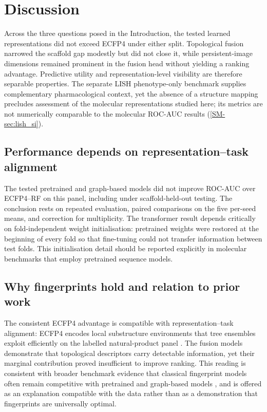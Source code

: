 \documentclass[11pt,a4paper]{article}
\begin{document}
\section{Discussion}

Across the three questions posed in the Introduction, the tested learned representations did not exceed ECFP4 under either split. Topological fusion narrowed the scaffold gap modestly but did not close it, while persistent-image dimensions remained prominent in the fusion head without yielding a ranking advantage. Predictive utility and representation-level visibility are therefore separable properties. The separate LISH phenotype-only benchmark supplies complementary pharmacological context, yet the absence of a structure mapping precludes assessment of the molecular representations studied here; its metrics are not numerically comparable to the molecular ROC-AUC results (\cref{SM-sec:lish_si}).

\subsection{Performance depends on representation--task alignment}

The tested pretrained and graph-based models did not improve ROC-AUC over ECFP4--RF on this panel, including under scaffold-held-out testing. The conclusion rests on repeated evaluation, paired comparisons on the five per-seed means, and correction for multiplicity. The transformer result depends critically on fold-independent weight initialisation: pretrained weights were restored at the beginning of every fold so that fine-tuning could not transfer information between test folds. This initialisation detail should be reported explicitly in molecular benchmarks that employ pretrained sequence models.

\subsection{Why fingerprints hold and relation to prior work}

The consistent ECFP4 advantage is compatible with representation--task alignment: ECFP4 encodes local substructure environments that tree ensembles exploit efficiently on the labelled natural-product panel \citep{ecfp_2010,learning_mol_repr_2020}. The fusion models demonstrate that topological descriptors carry detectable information, yet their marginal contribution proved insufficient to improve ranking. This reading is consistent with broader benchmark evidence that classical fingerprint models often remain competitive with pretrained and graph-based models \citep{guo_ding_2026,benchmark_pretrained_2025}, and is offered as an explanation compatible with the data rather than as a demonstration that fingerprints are universally optimal.
\end{document}
